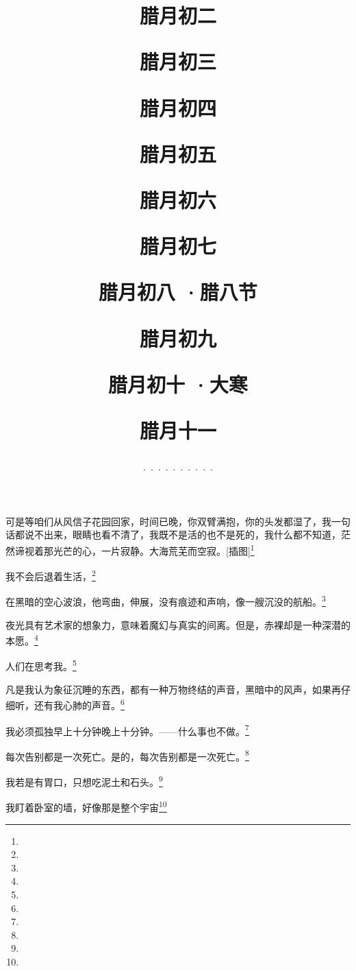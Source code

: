 \title{\date[d=12,m=1,y=2024][year:cn-y,年,month:cn,day:cn,日,·,weekday]·腊月初二 }
可是等咱们从风信子花园回家，时间已晚，你双臂满抱，你的头发都湿了，我一句话都说不出来，眼睛也看不清了，我既不是活的也不是死的，我什么都不知道，茫然谛视着那光芒的心，一片寂静。大海荒芜而空寂。[插图]\footnote{ }

\title{\date[d=13,m=1,y=2024][year:cn-y,年,month:cn,day:cn,日,·,weekday]·腊月初三 }
我不会后退着生活，\footnote{ }

\title{\date[d=14,m=1,y=2024][year:cn-y,年,month:cn,day:cn,日,·,weekday]·腊月初四 }
在黑暗的空心波浪，他弯曲，伸展，没有痕迹和声响，像一艘沉没的航船。\footnote{ }

\title{\date[d=15,m=1,y=2024][year:cn-y,年,month:cn,day:cn,日,·,weekday]·腊月初五 }
夜光具有艺术家的想象力，意味着魔幻与真实的间离。但是，赤裸却是一种深潜的本愿。\footnote{ }

\title{\date[d=16,m=1,y=2024][year:cn-y,年,month:cn,day:cn,日,·,weekday]·腊月初六 }
人们在思考我。\footnote{ }

\title{\date[d=17,m=1,y=2024][year:cn-y,年,month:cn,day:cn,日,·,weekday]·腊月初七 }
凡是我认为象征沉睡的东西，都有一种万物终结的声音，黑暗中的风声，如果再仔细听，还有我心肺的声音。\footnote{ }

\title{\date[d=18,m=1,y=2024][year:cn-y,年,month:cn,day:cn,日,·,weekday]·腊月初八 ·腊八节}
我必须孤独早上十分钟晚上十分钟。——什么事也不做。\footnote{ }

\title{\date[d=19,m=1,y=2024][year:cn-y,年,month:cn,day:cn,日,·,weekday]·腊月初九 }
每次告别都是一次死亡。是的，每次告别都是一次死亡。\footnote{ }

\title{\date[d=20,m=1,y=2024][year:cn-y,年,month:cn,day:cn,日,·,weekday]·腊月初十 ·大寒}
我若是有胃口，只想吃泥土和石头。\footnote{ }

\title{\date[d=21,m=1,y=2024][year:cn-y,年,month:cn,day:cn,日,·,weekday]·腊月十一 }
我盯着卧室的墙，好像那是整个宇宙\footnote{ }

